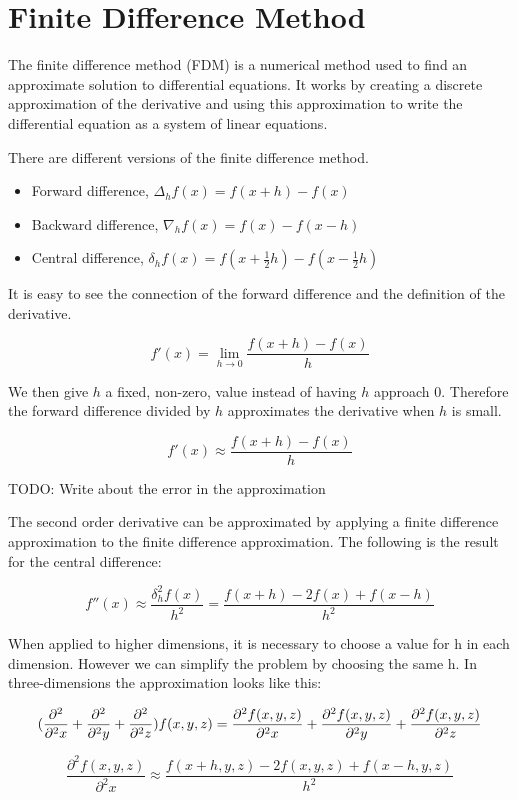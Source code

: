 \section*{Finite Difference Method}

The finite difference method (FDM) is a numerical method used to find an approximate 
solution to differential equations. It works by creating a discrete approximation 
of the derivative and using this approximation to write the differential equation 
as a system of linear equations.

There are different versions of the finite difference method.
\begin{itemize}
	\item Forward difference, $\Delta_hf(x) = f(x+h) - f(x)$
	\item Backward difference, $\nabla_hf(x) = f(x) - f(x - h)$
	\item Central difference, $\delta_hf(x) = f(x + \frac{1}{2}h) - f(x - \frac{1}{2}h)$
\end{itemize}

It is easy to see the connection of the forward difference and the definition of 
the derivative.

$$f'(x) = \lim_{h \to 0} \frac{f(x+h) - f(x)}{h}$$

We then give $h$ a fixed, non-zero, value instead of having $h$ approach 0. Therefore 
the forward difference divided by $h$ approximates the derivative when $h$ is small.

$$f'(x) \approx \frac{f(x+h) - f(x)}{h}$$

TODO: Write about the error in the approximation

The second order derivative can be approximated by applying a finite difference 
approximation to the finite difference approximation. The following is the result 
for the central difference:

$$f''(x) \approx \frac{\delta_h^2f(x)}{h^2} = \frac{f(x+h) - 2f(x) + f(x-h)}{h^2}$$

When applied to higher dimensions, it is necessary to choose a value for h in each dimension. However we can simplify the problem by choosing the same h. In three-dimensions the approximation looks like this:

$$(\frac{\partial^2}{\partial^2 x} + \frac{\partial^2}{\partial^2 y} + \frac{\partial^2}{\partial^2 z}) f (x, y, z) = \frac{\partial^2 f(x, y, z)}{\partial^2 x} 
+ \frac{\partial^2 f(x, y, z)}{\partial^2 y} + \frac{\partial^2 f(x, y, z)}{\partial^2 z}$$

$$\frac{\partial^2 f(x, y, z)}{\partial^2 x} \approx \frac{f(x+h, y, z) - 2f(x, y, z) + f(x-h, y, z)}{h^2}$$

